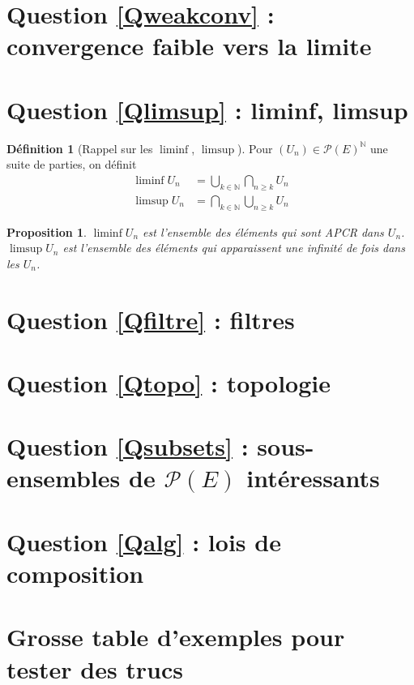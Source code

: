 \documentclass{article}
\newcommand{\N}{\mathbb{N}}
\renewcommand{\P}{\mathcal{P}}
\theoremstyle{plain}
\newtheorem{proposition}[theorem]{Proposition}
\theoremstyle{definition}
\newtheorem{definition}[theorem]{Définition}
\theoremstyle{remark}
\begin{document}
\section{Question \ref{Qweakconv} : convergence faible vers la limite}

\section{Question \ref{Qlimsup} : liminf, limsup}

\begin{definition}[Rappel sur les $\liminf$, $\limsup$]
    Pour $(U_n) \in \P(E)^\N$ une suite de parties, on définit
    \begin{align*}
        \liminf U_n & = \bigcup_{k\in \N} \bigcap_{n\ge k} U_n \\
        \limsup U_n & = \bigcap_{k \in \N} \bigcup_{n \ge k} U_n
    \end{align*}
\end{definition}

\begin{proposition}
    $\liminf U_n$ est l'ensemble des éléments qui sont APCR dans $U_n$. $\limsup U_n$ est l'ensemble des éléments qui apparaissent une infinité de fois dans les $U_n$.
\end{proposition}

\section{Question \ref{Qfiltre} : filtres}

\section{Question \ref{Qtopo} : topologie}

\section{Question \ref{Qsubsets} : sous-ensembles de $\P(E)$ intéressants}

\section{Question \ref{Qalg} : lois de composition}

\section{Grosse table d'exemples pour tester des trucs}
\end{document}

